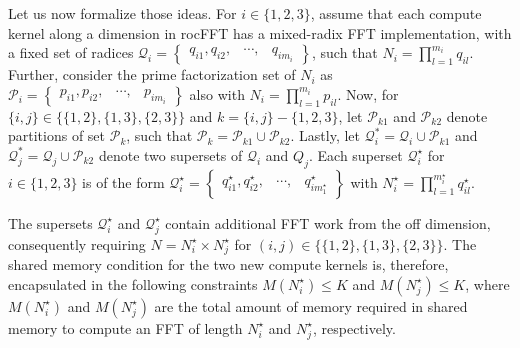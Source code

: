 \documentclass{gtac}
\theoremstyle{problemstyle}
\begin{document}
Let us now formalize those ideas. For $i \in \{1,2,3\}$, assume that each compute kernel along a dimension in rocFFT has a mixed-radix FFT implementation, with a fixed set of radices $\mathcal{Q}_i=\begin{Bmatrix} q_{i1}, q_{i2}, & \cdots, & q_{im_i} \end{Bmatrix}$, such that $N_i = \prod_{l=1}^{m_i} q_{il}$. Further, consider the prime factorization set of $N_i$ as $\mathcal{P}_i=\begin{Bmatrix} p_{i1}, p_{i2}, & \cdots, & p_{im_i} \end{Bmatrix}$ also with $N_i = \prod_{l=1}^{m_i} p_{il}$. Now, for $\{i,j\} \in \bigl \{ \{1,2\}, \{1,3\}, \{2,3\} \bigr \}$ and $k = \{i,j\} - \{1,2,3\}$, let $\mathcal{P}_{k1}$ and $\mathcal{P}_{k2}$ denote partitions of set $\mathcal{P}_k$, such that $\mathcal{P}_k = \mathcal{P}_{k1} \cup \mathcal{P}_{k2}$. Lastly, let $\mathcal{Q}_i^* = \mathcal{Q}_i \cup \mathcal{P}_{k1}$ and $\mathcal{Q}_j^* = \mathcal{Q}_j \cup \mathcal{P}_{k2}$ denote two supersets of $\mathcal{Q}_i$ and $Q_j$. Each superset $\mathcal{Q}_i^\star$ for $i \in \{1,2,3\}$ is of the form $\mathcal{Q}^{\star}_i=\begin{Bmatrix} q_{i1}^{\star}, q_{i2}^{\star}, & \cdots, & q_{im^{\star}_1}^{\star} \end{Bmatrix}$ with $N_i^\star = \prod_{l=1}^{m_i^\star} q_{il}^\star$. 

The supersets $\mathcal{Q}_i^\star$ and $\mathcal{Q}_j^\star$ contain additional FFT work from the off dimension, consequently requiring $N = N^\star_i \times N^\star_j$ for $(i,j) \in \bigl \{ \{1,2\}, \{1,3\}, \{2,3\} \bigr \}$. The shared memory condition for the two new compute kernels is, therefore, encapsulated in the following constraints $M(N^\star_i) \leq K$  and $M( N^\star_j) \leq K$, where $M(N^\star_i)$ and $M( N^\star_j)$ are the total amount of memory required in shared memory to compute an FFT of length $N^\star_i$ and $N^\star_j$, respectively. 
\end{document}
